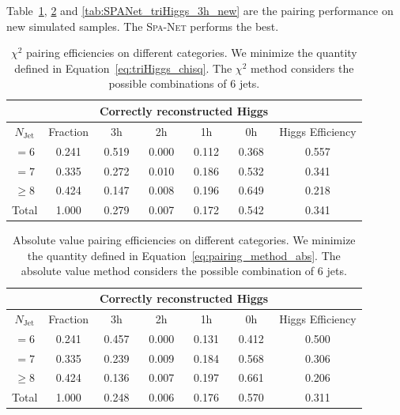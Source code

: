 \documentclass[12pt]{article}
\begin{document}
    Table~\ref{tab:chi2_pairing_triHiggs_3h_new}, \ref{tab:chi2_abs_pairing_triHiggs_3h_new} and \ref{tab:SPANet_triHiggs_3h_new} are the pairing performance on new simulated samples. The \textsc{Spa-Net} performs the best.
    \begin{table}[htpb]
        \centering
        \caption{$\chi^2$ pairing efficiencies on different categories. We minimize the quantity defined in Equation~\ref{eq:triHiggs_chisq}. The $\chi^2$ method considers the possible combinations of 6 jets.}
        \label{tab:chi2_pairing_triHiggs_3h_new}
        \begin{tabular}{c|c|cccc|c}
        \multicolumn{1}{l|}{} &          & \multicolumn{4}{c|}{Correctly reconstructed Higgs} & \multicolumn{1}{l}{} \\ \hline
        $N_\text{Jet}$        & Fraction & 3h          & 2h         & 1h         & 0h         & Higgs Efficiency     \\ \hline
        $=6$                  & 0.241    & 0.519       & 0.000      & 0.112      & 0.368      & 0.557                \\
        $=7$                  & 0.335    & 0.272       & 0.010      & 0.186      & 0.532      & 0.341                \\
        $\ge 8$               & 0.424    & 0.147       & 0.008      & 0.196      & 0.649      & 0.218                \\ \hline
        Total                 & 1.000    & 0.279       & 0.007      & 0.172      & 0.542      & 0.341
        \end{tabular}
    \end{table}
    \begin{table}[htpb]
        \centering
        \caption{Absolute value pairing efficiencies on different categories. We minimize the quantity defined in Equation~\ref{eq:pairing_method_abs}. The absolute value method considers the possible combination of 6 jets.}
        \label{tab:chi2_abs_pairing_triHiggs_3h_new}
        \begin{tabular}{c|c|cccc|c}
            \multicolumn{1}{l|}{} &          & \multicolumn{4}{c|}{Correctly reconstructed Higgs} & \multicolumn{1}{l}{} \\ \hline
            $N_\text{Jet}$        & Fraction & 3h          & 2h         & 1h         & 0h         & Higgs Efficiency     \\ \hline
            $=6$                  & 0.241    & 0.457 & 0.000 & 0.131 & 0.412 &  0.500                \\
            $=7$                  & 0.335    & 0.239 & 0.009 & 0.184 & 0.568 &  0.306                \\
            $\ge 8$               & 0.424    & 0.136 & 0.007 & 0.197 & 0.661 &  0.206                \\ \hline
            Total                 & 1.000    & 0.248 & 0.006 & 0.176 & 0.570 &  0.311
        \end{tabular}
    \end{table}
\end{document}
